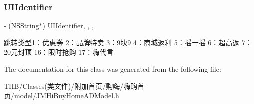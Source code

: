 \subsubsection{\texorpdfstring{U\+I\+Identifier}{UIIdentifier}}
{\footnotesize\ttfamily -\/ (N\+S\+String$\ast$) U\+I\+Identifier\hspace{0.3cm}{\ttfamily [read]}, {\ttfamily [write]}, {\ttfamily [nonatomic]}, {\ttfamily [copy]}}

跳转类型1：优惠券 2：品牌特卖 3：9块9 4：商城返利 5：摇一摇 6：超高返 7：20元封顶 16：限时抢购 17：嗨代言 

The documentation for this class was generated from the following file\+:\begin{DoxyCompactItemize}
\item 
T\+H\+B/\+Classes(类文件)/附加首页/购嗨/嗨购首页/model/J\+M\+Hi\+Buy\+Home\+A\+D\+Model.\+h\end{DoxyCompactItemize}
